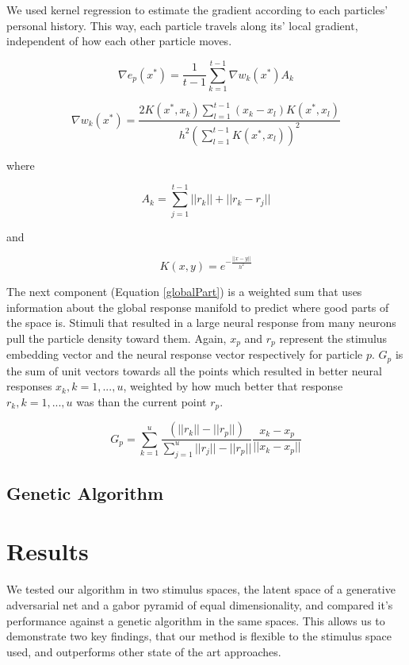 We used kernel regression to estimate the gradient according to each particles’ personal history. This way, each particle travels along its' local gradient, independent of how each other particle moves. 

\begin{equation}
	\nabla e_p (x^* )=\frac{1}{t-1} \sum_{k=1}^{t-1} \nabla w_k (x^* )  A_k
\end{equation}

\begin{equation}
	\nabla w_k (x^* )=\frac{2K(x^*,x_k) \sum_{l=1}^{t-1} (x_k-x_l)K(x^*,x_l)} {h^2\left(\sum_{l=1}^{t-1}K(x^*, x_l)\right)^2}
\end{equation}

where

\begin{equation}
	A_k = \sum_{j=1}^{t-1}||r_k||+||r_k-r_j||
\end{equation}

and

\begin{equation}
	K(x,y)=e^{- \frac{||x-y||}{h^2}}
\end{equation}

The next component (Equation \ref{globalPart}) is a weighted sum that uses information about the global response manifold to predict where good parts of the space is. Stimuli that resulted in a large neural response from many neurons pull the particle density toward them. Again, $x_p$ and $r_p$ represent the stimulus embedding vector and the neural response vector respectively for particle $p$. $G_p$ is the sum of unit vectors towards all the points which resulted in better neural responses $x_k, k = 1,...,u$, weighted by how much better that response $r_k, k = 1,...,u$ was than the current point $r_p$.

\begin{equation}
	G_p = \sum_{k=1}^{u}\frac{(||r_k||-||r_p||)}{\sum_{j=1}^{u}||r_j||-||r_p||} \frac {x_k-x_p}{||x_k-x_p||}\label{globalPart}
\end{equation}

\subsection{Genetic Algorithm}


\section{Results}
We tested our algorithm in two stimulus spaces, the latent space of a generative adversarial net and a gabor pyramid of equal dimensionality, and compared it's performance against a genetic algorithm in the same spaces. This allows us to demonstrate two key findings, that our method is flexible to the stimulus space used, and outperforms other state of the art approaches. 


